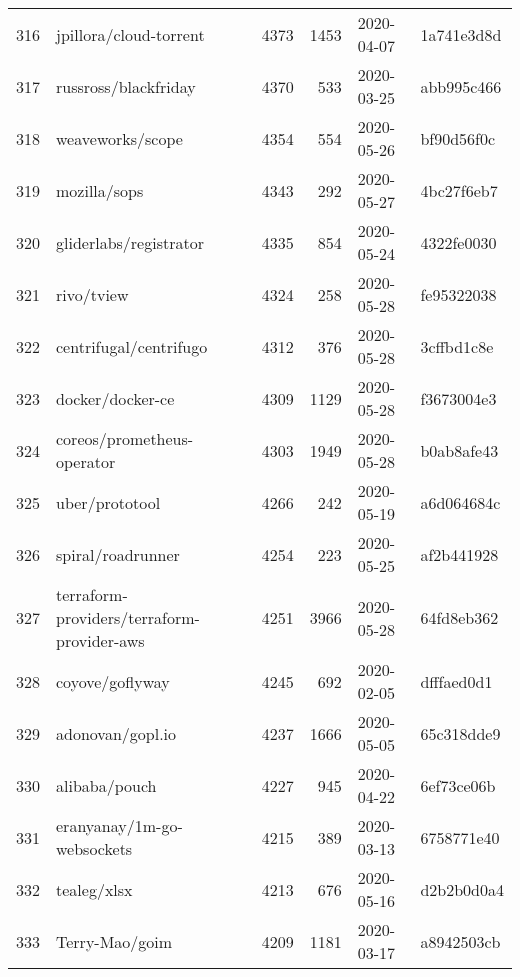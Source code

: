 \begin{longtable}{llrrll}
    316 &                             jpillora/cloud-torrent &   4373 &   1453 & 2020-04-07 &  1a741e3d8d \\
    317 &                               russross/blackfriday &   4370 &    533 & 2020-03-25 &  abb995c466 \\
    318 &                                   weaveworks/scope &   4354 &    554 & 2020-05-26 &  bf90d56f0c \\
    319 &                                       mozilla/sops &   4343 &    292 & 2020-05-27 &  4bc27f6eb7 \\
    320 &                             gliderlabs/registrator &   4335 &    854 & 2020-05-24 &  4322fe0030 \\
    321 &                                         rivo/tview &   4324 &    258 & 2020-05-28 &  fe95322038 \\
    322 &                             centrifugal/centrifugo &   4312 &    376 & 2020-05-28 &  3cffbd1c8e \\
    323 &                                   docker/docker-ce &   4309 &   1129 & 2020-05-28 &  f3673004e3 \\
    324 &                         coreos/prometheus-operator &   4303 &   1949 & 2020-05-28 &  b0ab8afe43 \\
    325 &                                     uber/prototool &   4266 &    242 & 2020-05-19 &  a6d064684c \\
    326 &                                  spiral/roadrunner &   4254 &    223 & 2020-05-25 &  af2b441928 \\
    327 &         terraform-providers/terraform-provider-aws &   4251 &   3966 & 2020-05-28 &  64fd8eb362 \\
    328 &                                    coyove/goflyway &   4245 &    692 & 2020-02-05 &  dfffaed0d1 \\
    329 &                                   adonovan/gopl.io &   4237 &   1666 & 2020-05-05 &  65c318dde9 \\
    330 &                                      alibaba/pouch &   4227 &    945 & 2020-04-22 &  6ef73ce06b \\
    331 &                         eranyanay/1m-go-websockets &   4215 &    389 & 2020-03-13 &  6758771e40 \\
    332 &                                        tealeg/xlsx &   4213 &    676 & 2020-05-16 &  d2b2b0d0a4 \\
    333 &                                     Terry-Mao/goim &   4209 &   1181 & 2020-03-17 &  a8942503cb \\

\end{longtable}
